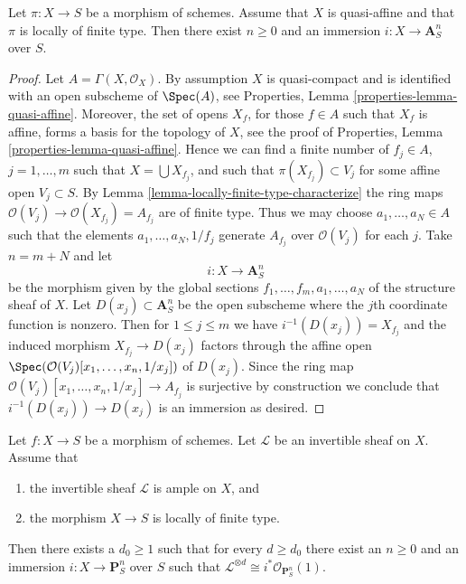 \begin{lemma}
\label{lemma-quasi-affine-finite-type-over-S}
Let $\pi : X \to S$ be a morphism of schemes.
Assume that $X$ is quasi-affine and that $\pi$ is locally of finite type.
Then there exist $n \geq 0$ and an immersion $i : X \to \mathbf{A}^n_S$
over $S$.
\end{lemma}

\begin{proof}
Let $A = \Gamma(X, \mathcal{O}_X)$. By assumption $X$ is quasi-compact
and is identified with an open subscheme of $\Spec(A)$, see
Properties, Lemma \ref{properties-lemma-quasi-affine}.
Moreover, the set of opens $X_f$, for those $f \in A$ such that $X_f$ is
affine, forms a basis for the topology of $X$, see the proof of
Properties, Lemma \ref{properties-lemma-quasi-affine}.
Hence we can find a finite number of $f_j \in A$, $j = 1, \ldots, m$ such that
$X = \bigcup X_{f_j}$, and such that $\pi(X_{f_j}) \subset V_j$ for
some affine open $V_j \subset S$. By
Lemma \ref{lemma-locally-finite-type-characterize}
the ring maps $\mathcal{O}(V_j) \to \mathcal{O}(X_{f_j}) = A_{f_j}$
are of finite type. Thus we may choose $a_1, \ldots, a_N \in A$ such that
the elements $a_1, \ldots, a_N, 1/f_j$ generate
$A_{f_j}$ over $\mathcal{O}(V_j)$ for each $j$. Take $n = m + N$ and
let
$$
i : X \longrightarrow \mathbf{A}^n_S
$$
be the morphism given by the global sections
$f_1, \ldots, f_m, a_1, \ldots, a_N$ of the structure sheaf of $X$.
Let $D(x_j) \subset \mathbf{A}^n_S$ be the open subscheme where the
$j$th coordinate function is nonzero.
Then for $1 \leq j \leq m$ we have $i^{-1}(D(x_j)) = X_{f_j}$ and
the induced morphism $X_{f_j} \to D(x_j)$ factors through the affine
open $\Spec(\mathcal{O}(V_j)[x_1, \ldots, x_n, 1/x_j])$
of $D(x_j)$. Since the ring map
$\mathcal{O}(V_j)[x_1, \ldots, x_n, 1/x_j] \to A_{f_j}$ is
surjective by construction we conclude that $i^{-1}(D(x_j)) \to D(x_j)$
is an immersion as desired.
\end{proof}

\begin{lemma}
\label{lemma-quasi-projective-finite-type-over-S}
Let $f : X \to S$ be a morphism of schemes.
Let $\mathcal{L}$ be an invertible sheaf on $X$.
Assume that
\begin{enumerate}
\item the invertible sheaf $\mathcal{L}$ is ample on $X$, and
\item the morphism $X \to S$ is locally of finite type.
\end{enumerate}
Then there exists a $d_0 \geq 1$ such that for every $d \geq d_0$
there exist an $n \geq 0$ and an immersion
$i : X \to \mathbf{P}^n_S$ over $S$ such that
$\mathcal{L}^{\otimes d} \cong i^*\mathcal{O}_{\mathbf{P}^n_S}(1)$.
\end{lemma}

